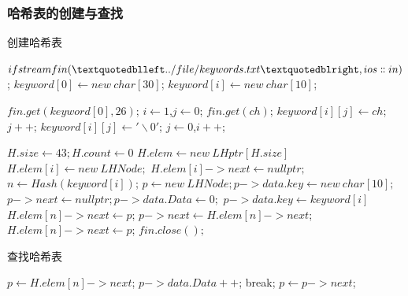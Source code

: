 \documentclass[a4paper]{article}
\begin{document}
	\subsubsection{哈希表的创建与查找}
	\begin{algorithm}[H]
		\caption{创建哈希表}
		\begin{algorithmic}[1] %
				\State $ifstream fin(“../file/keywords.txt”, ios \dblcolon in)$;
				\State $keyword[0] \gets new\ char[30]$;
					\State $keyword[i] \gets new\ char[10]$;
				\EndFor

				\State $fin.get(keyword[0], 26)$;
				\State $i\gets 1$,$j\gets 0$;
					\State $fin.get(ch)$;
						\State $keyword[i][j] \gets  ch$;
						\State $j++$;
					\Else
						\State $keyword[i][j] \gets '\backslash 0'$;
						\State $j \gets  0$,$i++$;
					\EndIf
				\EndWhile

				\State $H.size \gets  43;H.count \gets  0$
				\State $H.elem \gets  new\ LHptr[H.size]$
					\State $H.elem[i] \gets  new\ LHNode;$ 
					\State $H.elem[i]->next \gets  nullptr;$
				\EndFor
					\State $n \gets  Hash(keyword[i])$;
					\State $p \gets  new\ LHNode;p->data.key \gets  new\ char[10];$
					\State $p->next \gets  nullptr;p->data.Data \gets  0;$
					\State $p->data.key \gets keyword[i]$
						\State $H.elem[n]->next \gets  p$;
					\Else
						\State $p->next \gets  H.elem[n]->next$;
						\State $H.elem[n]->next \gets  p$;
					\EndIf
				\EndFor
				\State $fin.close();$
			\EndFunction
		\end{algorithmic}\label{alg:algorithm}
	\end{algorithm}

	\begin{algorithm}[H]
		\caption{查找哈希表}
		\begin{algorithmic}[1] %
				\State $p \gets H.elem[n]->next$;
						\State $p->data.Data++$;
						\State break;
					\EndIf
					\State $p \gets p->next$;
				\EndWhile
			\EndFunction
		\end{algorithmic}\label{alg:algorithm2}
	\end{algorithm}
\end{document}
